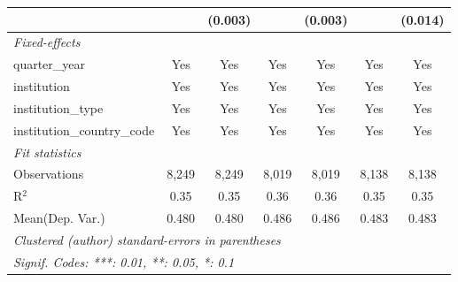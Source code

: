 \begin{tabular}{lcccccc}
                                      &              & (0.003)      &               & (0.003)      &              & (0.014)\\   
   \midrule
   \emph{Fixed-effects}\\
   quarter\_year                      & Yes          & Yes          & Yes           & Yes          & Yes          & Yes\\  
   institution                        & Yes          & Yes          & Yes           & Yes          & Yes          & Yes\\  
   institution\_type                  & Yes          & Yes          & Yes           & Yes          & Yes          & Yes\\  
   institution\_country\_code         & Yes          & Yes          & Yes           & Yes          & Yes          & Yes\\  
   \midrule
   \emph{Fit statistics}\\
   Observations                       & 8,249        & 8,249        & 8,019         & 8,019        & 8,138        & 8,138\\  
   R$^2$                              & 0.35         & 0.35         & 0.36          & 0.36         & 0.35         & 0.35\\  
Mean(Dep. Var.) & 0.480 & 0.480 & 0.486 & 0.486 & 0.483 & 0.483 \\
   \midrule \midrule
   \multicolumn{7}{l}{\emph{Clustered (author) standard-errors in parentheses}}\\
   \multicolumn{7}{l}{\emph{Signif. Codes: ***: 0.01, **: 0.05, *: 0.1}}\\
\end{tabular}
\par\endgroup

